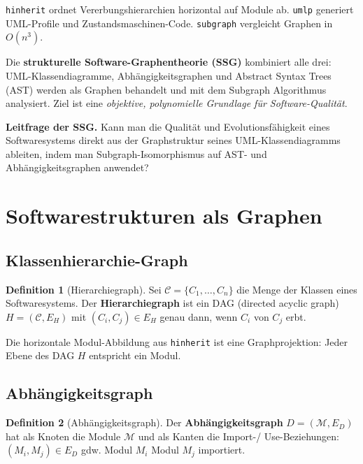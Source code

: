 ﻿\documentclass[a4paper,12pt]{scrreprt}
\theoremstyle{definition}
\newtheorem{definition}{Definition}[section]
\begin{document}
\texttt{hinherit} ordnet Vererbungshierarchien horizontal auf Module ab.
\texttt{umlp} generiert UML-Profile und Zustandsmaschinen-Code.
\texttt{subgraph} vergleicht Graphen in $O(n^3)$.

Die \textbf{strukturelle Software-Graphentheorie (SSG)} kombiniert
alle drei: UML-Klassendiagramme, Abhängigkeitsgraphen und
Abstract Syntax Trees (AST) werden als Graphen behandelt und mit
dem Subgraph Algorithmus analysiert. Ziel ist eine
\emph{objektive, polynomielle Grundlage für Software-Qualität}.

\begin{infobox}
\textbf{Leitfrage der SSG.}
Kann man die Qualität und Evolutionsfähigkeit eines Softwaresystems
direkt aus der Graphstruktur seines UML-Klassendiagramms ableiten,
indem man Subgraph-Isomorphismus auf AST- und Abhängigkeitsgraphen
anwendet?
\end{infobox}

\section{Softwarestrukturen als Graphen}

\subsection{Klassenhierarchie-Graph}

\begin{definition}[Hierarchiegraph]
  Sei $\mathcal{C} = \{C_1,\ldots,C_n\}$ die Menge der Klassen eines
  Softwaresystems. Der \textbf{Hierarchiegraph} ist ein DAG (directed
  acyclic graph) $H = (\mathcal{C}, E_H)$ mit $(C_i, C_j) \in E_H$
  genau dann, wenn $C_i$ von $C_j$ erbt.
\end{definition}

Die horizontale Modul-Abbildung aus \texttt{hinherit} ist eine
Graphprojektion: Jeder Ebene des DAG $H$ entspricht ein Modul.

\subsection{Abhängigkeitsgraph}

\begin{definition}[Abhängigkeitsgraph]
  Der \textbf{Abhängigkeitsgraph} $D = (\mathcal{M}, E_D)$ hat als
  Knoten die Module $\mathcal{M}$ und als Kanten die Import-/
  Use-Beziehungen: $(M_i, M_j) \in E_D$ gdw. Modul $M_i$ Modul
  $M_j$ importiert.
\end{definition}
\end{document}
